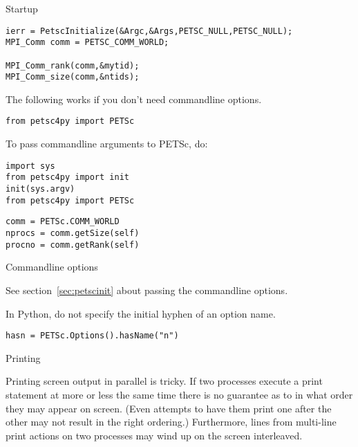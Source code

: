 
 {Startup}
\label{sec:petscinit}

\begin{verbatim}
ierr = PetscInitialize(&Argc,&Args,PETSC_NULL,PETSC_NULL);
MPI_Comm comm = PETSC_COMM_WORLD;

MPI_Comm_rank(comm,&mytid);
MPI_Comm_size(comm,&ntids);
\end{verbatim}

\begin{pythonnote}
  The following works if you don't need commandline options.
\begin{verbatim}
from petsc4py import PETSc
\end{verbatim}
To pass commandline arguments to PETSc, do:
\begin{verbatim}
import sys
from petsc4py import init
init(sys.argv)
from petsc4py import PETSc
\end{verbatim}
\end{pythonnote}

\begin{verbatim}
comm = PETSc.COMM_WORLD
nprocs = comm.getSize(self) 
procno = comm.getRank(self)
\end{verbatim}

 {Commandline options}

See section~\ref{sec:petscinit} about passing the commandline options.

\begin{pythonnote}
  In Python, do not specify the initial hyphen of an option name.
\begin{verbatim}
hasn = PETSc.Options().hasName("n")
\end{verbatim}
\end{pythonnote}

 {Printing}

Printing screen output in parallel is tricky. If two processes execute
a print statement at more or less the same time there is no guarantee
as to in what order they may appear on screen. (Even attempts to have
them print one after the other may not result in the right ordering.)
Furthermore, lines from multi-line print actions on two processes may
wind up on the screen interleaved.

